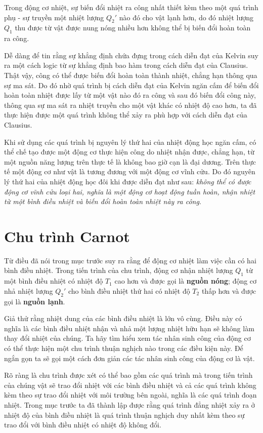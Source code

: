 Trong động cơ nhiệt, sự biến đổi nhiệt ra công nhất thiết kèm theo một quá trình phụ - sự truyền một nhiệt lượng $Q_2'$ nào đó cho vật lạnh hơn, do đó nhiệt lượng $Q_1$ thu được từ vật được nung nóng nhiều hơn không thể bị biến đổi hoàn toàn ra công.

Dễ dàng để tin rằng sự khẳng định chứa đựng trong cách diễn đạt của Kelvin suy ra một cách logic từ sự khẳng định bao hàm trong cách diễn đạt của Clausius. Thật vậy, công có thể được biến đổi hoàn toàn thành nhiệt, chẳng hạn thông qua sự ma sát. Do đó nhờ quá trình bị cách diễn đạt của Kelvin ngăn cấm để biến đổi hoàn toàn nhiệt được lấy từ một vật nào đó ra công và sau đó biến đổi công này, thông qua sự ma sát ra nhiệt truyền cho một vật khác có nhiệt độ cao hơn, ta đã thực hiện được một quá trình không thể xảy ra phù hợp với cách diễn đạt của Clausius.

Khi sử dụng các quá trình bị nguyên lý thứ hai của nhiệt động học ngăn cấm, có thể chế tạo được một động cơ thực hiện công do nhiệt nhận được, chẳng hạn, từ một nguồn năng lượng trên thực tế là không bao giờ cạn là đại dương. Trên thực tế một động cơ như vật là tương đương với một động cơ vĩnh cửu. Do đó nguyên lý thứ hai của nhiệt động học đôi khi được diễn đạt như sau: \textit{không thể có được động cơ vĩnh cửu loại hai, nghĩa là một động cơ hoạt động tuần hoàn, nhận nhiệt từ một bình điều nhiệt và biến đổi hoàn toàn nhiệt này ra công}.

\section{Chu trình Carnot}\label{sec:12_2}

Từ điều đã nói trong mục trước suy ra rằng để động cơ nhiệt làm việc cần có hai bình điều nhiệt. Trong tiến trình của chu trình, động cơ nhận nhiệt lượng $Q_1$ từ một bình điều nhiệt có nhiệt độ $T_1$ cao hơn và được gọi là \textbf{nguồn nóng}; động cơ nhả nhiệt lượng $Q_2'$ cho bình điều nhiệt thứ hai có nhiệt độ $T_2$ thấp hơn và được gọi là \textbf{nguồn lạnh}.

Giả thử rằng nhiệt dung của các bình điều nhiệt là lớn vô cùng. Điều này có nghĩa là các bình điều nhiệt nhận và nhả một lượng nhiệt hữu hạn sẽ không làm thay đổi nhiệt của chúng. Ta hãy tìm hiểu xem tác nhân sinh công của động cơ có thể thực hiện một chu trình thuận nghịch nào trong các điều kiện này. Để ngắn gọn ta sẽ gọi một cách đơn giản các tác nhân sinh công của động cơ là vật.

Rõ ràng là chu trình được xét có thể bao gồm các quá trình mà trong tiến trình của chúng vật sẽ trao đổi nhiệt với các bình điều nhiệt và cả các quá trình không kèm theo sự trao đổi nhiệt với môi trường bên ngoài, nghĩa là các quá trình đoạn nhiệt. Trong mục trước ta đã thành lập được rằng quá trình đẳng nhiệt xảy ra ở nhiệt độ của bình điều nhiệt là quá trình thuận nghịch duy nhất kèm theo sự trao đổi với bình điều nhiệt có nhiệt độ không đổi.

